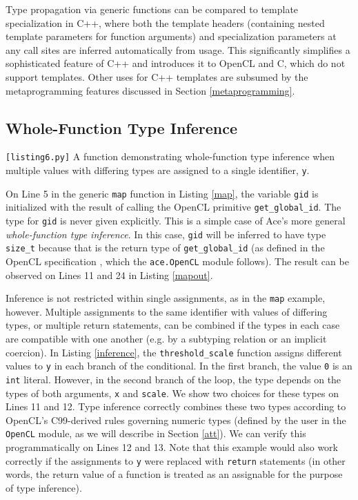 \documentclass{sig-alternate}
\begin{document}
Type propagation via generic functions can be compared to template specialization in C++, where both the template headers (containing nested template parameters for function arguments) and specialization parameters at any call sites are inferred automatically from usage. This significantly simplifies a sophisticated feature of C++ and introduces it to OpenCL and C, which do not support templates. Other uses for C++ templates are subsumed by the metaprogramming features discussed in Section \ref{metaprogramming}.

\subsection{Whole-Function Type Inference}
\begin{codelisting}

\caption{\texttt{[listing6.py]} A function demonstrating whole-function type inference when multiple values with differing types are assigned to a single identifier, \texttt{y}.}
\label{inference}
\end{codelisting}

On Line 5 in the generic \verb|map| function in Listing \ref{map}, the variable \verb|gid| is initialized with the result of calling the OpenCL primitive \verb|get_global_id|.  The type for \verb|gid| is never given explicitly. This is a simple case of Ace's more general {\em whole-function type inference}. In this case, \verb|gid| will be inferred to have type \verb|size_t| because that is the return type of \verb|get_global_id| (as defined in the OpenCL specification \cite{opencl}, which the \verb|ace.OpenCL| module follows). The result can be observed on Lines 11 and 24 in Listing \ref{mapout}. 

Inference is not restricted within single assignments, as in the \verb|map| example, however. Multiple assignments to the same identifier with values of differing types, or multiple return statements, can be combined if the types in each case are compatible with one another (e.g. by a subtyping relation or an implicit coercion). In Listing \ref{inference}, the \verb|threshold_scale| function assigns different values to \verb|y| in each branch of the conditional. In the first branch, the value \verb|0| is an \verb|int| literal. However, in the second branch of the loop, the type depends on the types of both arguments, \verb|x| and \verb|scale|. We show two choices for these types on Lines 11 and 12. Type inference correctly combines these two types according to OpenCL's C99-derived rules governing numeric types (defined by the user in the \verb|OpenCL| module, as we will describe in Section \ref{att}). We can verify this programmatically on Lines 12 and 13. Note that this example would also work correctly if the assignments to \verb|y| were replaced with \verb|return| statements (in other words, the return value of a function is treated as an assignable for the purpose of type inference).
\end{document}
